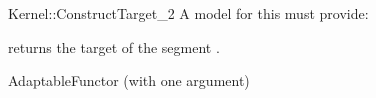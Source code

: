 \begin{ccRefFunctionObjectConcept}{Kernel::ConstructTarget_2}
A model for this must provide:


 {returns the target of
  the segment .}

\ccRefines
AdaptableFunctor (with one argument)

\ccSeeAlso
{}

\end{ccRefFunctionObjectConcept}
